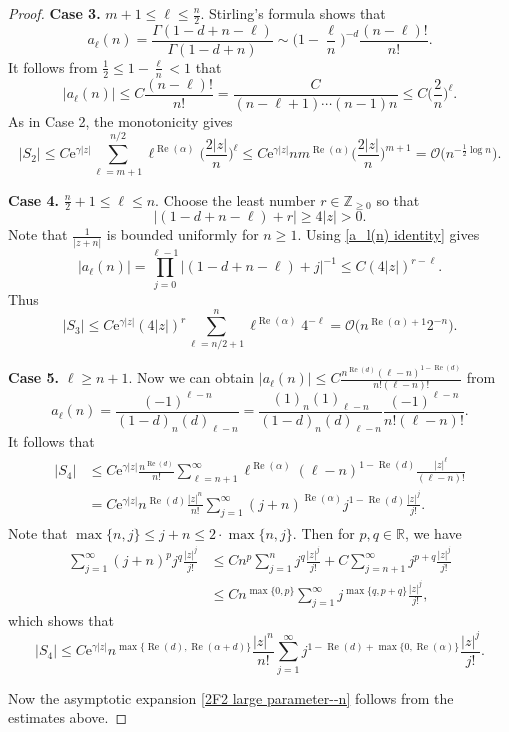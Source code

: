 \documentclass[pdftex]{sigma}
\numberwithin{equation}{section}
\newcommand{\RR}{\ensuremath{\mathbb{R}}}
\newcommand{\ZZ}{\ensuremath{\mathbb{Z}}}
\newcommand{\mo}{\mathcal{O}}
\begin{document}
\begin{proof}
	\textbf{Case 3.} $m+1\leqslant \ell\leqslant \frac{n}{2}$. Stirling's formula shows that
	\[a_\ell(n)=\frac{\Gamma(1-d+n-\ell)}{\Gamma(1-d+n)}\sim \biggl(1-\frac{\ell}{n}\biggr)^{-d}\frac{(n-\ell)!}{n!}.\]
	It follows from $\frac{1}{2}\leqslant 1-\frac{\ell}{n}<1$ that
	\[|a_\ell(n)|\leqslant C \frac{(n-\ell)!}{n!}=\frac{C}{(n-\ell+1)\cdots(n-1)n}\leqslant C\bigg(\frac{2}{n}\bigg)^{\ell}.\]
	As in Case 2, the monotonicity gives
	\[|S_2|\leqslant C\mathrm{e}^{\gamma|z|}\sum_{\ell=m+1}^{n/2}\ell^{\operatorname{Re}(\alpha)}\bigg(\frac{2|z|}{n}\bigg)^{\ell}\leqslant C\mathrm{e}^{\gamma|z|}nm^{\operatorname{Re}(\alpha)}\bigg(\frac{2|z|}{n}\bigg)^{m+1}=\mo\big(n^{-\frac{1}{2}\log n}\big).\]
	
	\textbf{Case 4.} $\frac{n}{2}+1\leqslant \ell\leqslant n$. Choose the least number $r\in\ZZ_{\geqslant 0}$ so that
	\[|(1-d+n-\ell)+r|\geqslant 4|z|>0.\]
	Note that $\frac{1}{|z+n|}$ is bounded uniformly for $n\geqslant 1$. Using \eqref{a_l(n) identity} gives
	\[|a_{\ell}(n)|=\prod_{j=0}^{\ell-1}\big|(1-d+n-\ell)+j\big|^{-1}\leqslant C(4|z|)^{r-\ell}.\]
	Thus
	\[|S_3|\leqslant C\mathrm{e}^{\gamma|z|}(4|z|)^r\sum_{\ell=n/2+1}^{n}\ell^{\operatorname{Re}(\alpha)}4^{-\ell}=\mo\big(n^{\operatorname{Re}(\alpha)+1}2^{-n}\big).\]
	
	\textbf{Case 5.} $\ell\geqslant n+1$. Now we can obtain $|a_\ell(n)|\leqslant C\frac{n^{\operatorname{Re}(d)}(\ell-n)^{1-\operatorname{Re}(d)}}{n!(\ell-n)!}$ from
	\[a_\ell(n)=\frac{(-1)^{\ell-n}}{(1-d)_n(d)_{\ell-n}}=\frac{(1)_n(1)_{\ell-n}}{(1-d)_n(d)_{\ell-n}}\frac{(-1)^{\ell-n}}{n!(\ell-n)!}.\]
	It follows that
	\begin{align*}
\begin{aligned}
		|S_4|&{} \leqslant C\mathrm{e}^{\gamma|z|}\frac{n^{\operatorname{Re}(d)}}{n!}\sum_{\ell=n+1}^{\infty}\ell^{\operatorname{Re}(\alpha)}(\ell-n)^{1-\operatorname{Re}(d)}\frac{|z|^{\ell}}{(\ell-n)!}\\
		&{} =C\mathrm{e}^{\gamma|z|}n^{\operatorname{Re}(d)}\frac{|z|^n}{n!}\sum_{j=1}^{\infty}(j+n)^{\operatorname{Re}(\alpha)}j^{1-\operatorname{Re}(d)}\frac{|z|^j}{j!}.
\end{aligned}
	\end{align*}
	Note that $\max\{n,j\}\leqslant j+n\leqslant 2\cdot\max\{n,j\}$. Then for $p,q\in\RR$, we have
	\begin{align*}
		\sum_{j=1}^{\infty}(j+n)^p j^q\frac{|z|^j}{j!}&{}\leqslant Cn^p\sum_{j=1}^{n}j^q\frac{|z|^j}{j!}+C\sum_{j=n+1}^{\infty}j^{p+q}\frac{|z|^j}{j!}\\
		&{} \leqslant Cn^{\max\{0,p\}}\sum_{j=1}^{\infty}j^{\max\{q,p+q\}}\frac{|z|^j}{j!},
	\end{align*}
	which shows that
	\[|S_4|\leqslant C\mathrm{e}^{\gamma|z|}n^{\max\{\operatorname{Re}(d),\operatorname{Re}(\alpha+d)\}}\frac{|z|^n}{n!}\sum_{j=1}^{\infty}j^{1-\operatorname{Re}(d)+\max\{0,\operatorname{Re}(\alpha)\}}\frac{|z|^j}{j!}.\]
	
	Now the asymptotic expansion \eqref{2F2 large parameter--n} follows from the estimates above.
\end{proof}
\end{document}
